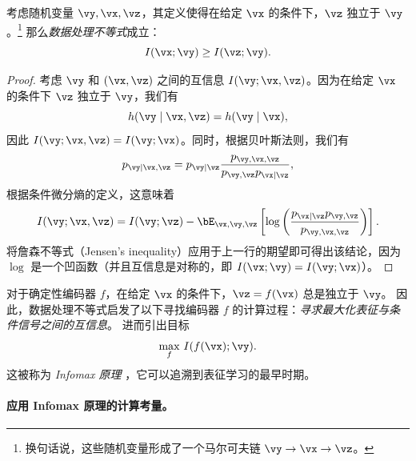 \documentclass[../../book-main_zh.tex]{subfiles}
\begin{document}
\begin{theorem}[数据处理不等式]\label{thm:dpi}
    考虑随机变量 $\vy, \vx, \vz$，其定义使得在给定 $\vx$ 的条件下，$\vz$ 独立于 $\vy$。\footnote{换句话说，这些随机变量形成了一个马尔可夫链 $\vy \to \vx \to \vz$。} 那么\textit{数据处理不等式}成立：
    \begin{equation}\label{eq:dpi-ch7}
        I(\vx; \vy) \geq I(\vz; \vy).
    \end{equation}
    \begin{proof}
        考虑 $\vy$ 和 $(\vx, \vz)$ 之间的互信息 $I(\vy; \vx, \vz)$。因为在给定 $\vx$ 的条件下 $\vz$ 独立于 $\vy$，我们有
        \begin{equation*}
            h(\vy \mid \vx, \vz) = h(\vy \mid \vx),
        \end{equation*}
        因此 $I(\vy; \vx, \vz) = I(\vy; \vx)$。同时，根据贝叶斯法则，我们有
        \begin{equation*}
            p_{\vy \mid \vx, \vz} = p_{\vy \mid \vz}
            \frac{p_{\vy, \vx, \vz}}{p_{\vy, \vz} p_{\vx \mid \vz}},
        \end{equation*}
        根据条件微分熵的定义，这意味着
        \begin{equation*}
            I(\vy; \vx, \vz) =
            I(\vy; \vz)
            - \bE_{\vx, \vy, \vz}\left[ \log \left(
                    \frac{p_{\vx \mid \vz} p_{\vy, \vz}}{p_{\vy, \vx, \vz}}
            \right)\right].
        \end{equation*}
        将詹森不等式（Jensen's inequality）应用于上一行的期望即可得出该结论，因为 $\log$ 是一个凹函数（并且互信息是对称的，即 $I(\vx; \vy) = I(\vy; \vx)$）。
    \end{proof}
\end{theorem}

对于确定性编码器 $f$，在给定 $\vx$ 的条件下，$\vz = f(\vx)$ 总是独立于 $\vy$。
因此，数据处理不等式启发了以下寻找编码器 $f$ 的计算过程：\textit{寻求最大化表征与条件信号之间的互信息}。
 进而引出目标
\begin{equation}\label{eq:infomax-x}
    \max_{f}\, I(f(\vx); \vy).
\end{equation}
这被称为 \textit{Infomax 原理} \cite{infomax}，它可以追溯到表征学习的最早时期。

\paragraph{应用 Infomax 原理的计算考量。}
\end{document}
